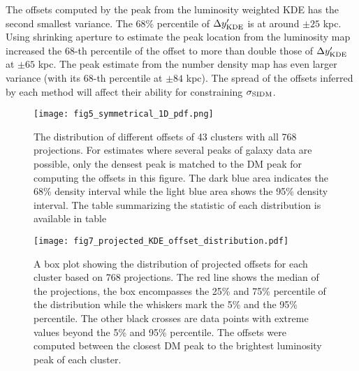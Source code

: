 The offsets computed by the peak from the luminosity weighted KDE 
has the second smallest variance. The 68\% percentile of $\Delta y_{\rm
KDE}'$ is at around $\pm 25$ kpc. Using shrinking aperture to estimate
the peak location from the luminosity map increased the 68-th percentile of the
offset to more than double those of $\Delta y_{\rm KDE}'$ at $\pm 65$ kpc.
The peak estimate from the number density map has even larger variance 
(with its 68-th percentile at $\pm 84$ kpc). 
The spread of the offsets inferred by each method will affect their ability
for constraining $\sigma_{\rm SIDM}$. 




\begin{figure*}
	\begin{center}
	\texttt{[image: fig5\_symmetrical\_1D\_pdf.png]}
	\caption{ 		
		The distribution of different offsets of 43 clusters with all 768
		projections. For estimates where several peaks of galaxy data are 
		possible, only the densest peak is matched to the DM peak for computing
		the offsets in this figure. 
		The dark blue area indicates the 68\% density interval
		while the light blue area shows the 95\% density interval. 
		The table summarizing the statistic of each distribution is available in
		table 
		\label{fig:offset_distributions}
	}
\end{center}
\end{figure*}

\begin{figure*}
	\begin{center}
	\texttt{[image: fig7\_projected\_KDE\_offset\_distribution.pdf]}
	\caption{A box plot showing the distribution of projected offsets for each cluster 
		based on 768 projections. The red line shows the median of the projections,
		the box encompasses the 25\% and 75\% percentile of the distribution while
		the whiskers mark the 5\% and the 95\% percentile. The other black crosses
		are data points with extreme values beyond the 5\% and 95\% percentile.
		The offsets were computed between the closest DM 
		peak to the brightest luminosity peak of each cluster. 		
		\label{fig:projected_KDE_offset_distribution}
	}
\end{center}
\end{figure*}




